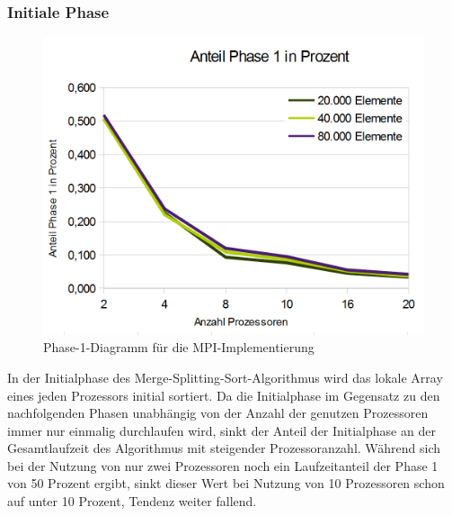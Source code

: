 \documentclass[a4paper,12pt]{scrartcl}
\begin{document}
\subsubsection{Initiale Phase}
\begin{figure}[htb]
  \begin{center}
    \includegraphics[width=1\hsize]{../Anteil_Phase_1.PNG}
  \end{center}
  \caption{\label{mpiphaseeins}
    Phase-1-Diagramm f\"ur die MPI-Implementierung}
\end{figure}
In der Initialphase des Merge-Splitting-Sort-Algorithmus wird das lokale Array eines jeden Prozessors initial sortiert. Da die Initialphase im Gegensatz zu den
nachfolgenden Phasen unabh\"angig von der Anzahl der genutzen Prozessoren immer nur einmalig durchlaufen wird, sinkt der Anteil der Initialphase an der
Gesamtlaufzeit des Algorithmus mit steigender Prozessoranzahl. W\"ahrend sich bei der Nutzung von nur zwei Prozessoren noch ein Laufzeitanteil der Phase 1 von
50 Prozent ergibt, sinkt dieser Wert bei Nutzung von 10 Prozessoren schon auf unter 10 Prozent, Tendenz weiter fallend.
\end{document}
